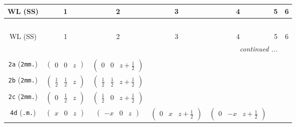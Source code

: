 \documentclass[fleqn,9pt,landscape]{jsarticle}
\begin{document}
\begin{center}
\renewcommand{\arraystretch}{1.2}
\begin{longtable}{ccccccc}
 \hline \hline
WL (SS) & 1 & 2 & 3 & 4 & 5 & 6 \\ \hline \endfirsthead

\multicolumn{6}{l}{\tablename\ \thetable{}} \\
 \hline \hline
WL (SS) & 1 & 2 & 3 & 4 & 5 & 6 \\ \hline \endhead

 \hline \hline
\multicolumn{6}{r}{\footnotesize\it continued ...} \\ \endfoot

 \hline \hline
\multicolumn{6}{r}{} \\ \endlastfoot

{\tt 2a} ({\tt 2mm.}) & $ \begin{pmatrix} 0 & 0 & z \end{pmatrix} $ & $ \begin{pmatrix} 0 & 0 & z + \frac{1}{2} \end{pmatrix} $ & $  $ & $  $ & $  $ & $  $ \\ \hline
{\tt 2b} ({\tt 2mm.}) & $ \begin{pmatrix} \frac{1}{2} & \frac{1}{2} & z \end{pmatrix} $ & $ \begin{pmatrix} \frac{1}{2} & \frac{1}{2} & z + \frac{1}{2} \end{pmatrix} $ & $  $ & $  $ & $  $ & $  $ \\ \hline
{\tt 2c} ({\tt 2mm.}) & $ \begin{pmatrix} 0 & \frac{1}{2} & z \end{pmatrix} $ & $ \begin{pmatrix} \frac{1}{2} & 0 & z + \frac{1}{2} \end{pmatrix} $ & $  $ & $  $ & $  $ & $  $ \\ \hline
{\tt 4d} ({\tt .m.}) & $ \begin{pmatrix} x & 0 & z \end{pmatrix} $ & $ \begin{pmatrix} - x & 0 & z \end{pmatrix} $ & $ \begin{pmatrix} 0 & x & z + \frac{1}{2} \end{pmatrix} $ & $ \begin{pmatrix} 0 & - x & z + \frac{1}{2} \end{pmatrix} $ & $  $ & $  $ \\ \hline

\end{longtable}
\end{center}
\end{document}
